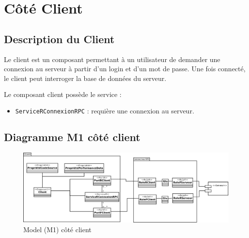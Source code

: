 \pagestyle{fancy}
\section{Côté Client}
\subsection{Description du Client}
Le client est un composant permettant  à un utilisateur de demander une connexion au serveur à partir d'un login et d'un mot de passe. Une fois connecté, le client peut interroger la base de données du serveur.
 
Le composant client possède le service : 
\begin{itemize}
\item 
  \verb+ServiceRConnexionRPC+ : requière une connexion au serveur.
\end{itemize}
\subsection{Diagramme M1 côté client}
\begin{figure}[htb]
  \centering
  \includegraphics[scale=0.24]{img/M11}
  \caption{Model (M1) côté client}
  \label{fig:M11}
\end{figure}

